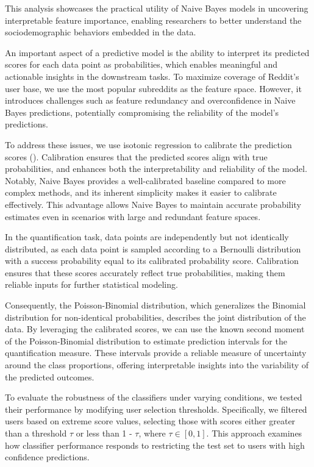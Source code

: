 This analysis showcases the practical utility of Naive Bayes models in uncovering interpretable feature importance, enabling researchers to better understand the sociodemographic behaviors embedded in the data.


An important aspect of a predictive model is the ability to interpret its predicted scores for each data point as probabilities, which enables meaningful and actionable insights in the downstream tasks.
To maximize coverage of Reddit's user base, we use the most popular subreddits as the feature space.
However, it introduces challenges such as feature redundancy and overconfidence in Naive Bayes predictions, potentially compromising the reliability of the model's predictions.

To address these issues, we use isotonic regression to calibrate the prediction scores ().
Calibration ensures that the predicted scores align with true probabilities, and enhances both the interpretability and reliability of the model.
Notably, Naive Bayes provides a well-calibrated baseline compared to more complex methods, and its inherent simplicity makes it easier to calibrate effectively.
This advantage allows Naive Bayes to maintain accurate probability estimates even in scenarios with large and redundant feature spaces.

In the quantification task, data points are independently but not identically distributed, as each data point is sampled according to a Bernoulli distribution with a success probability equal to its calibrated probability score.
Calibration ensures that these scores accurately reflect true probabilities, making them reliable inputs for further statistical modeling.

Consequently, the Poisson-Binomial distribution, which generalizes the Binomial distribution for non-identical probabilities, describes the joint distribution of the data.
By leveraging the calibrated scores, we can use the known second moment of the Poisson-Binomial distribution to estimate prediction intervals for the quantification measure.
These intervals provide a reliable measure of uncertainty around the class proportions, offering interpretable insights into the variability of the predicted outcomes.

To evaluate the robustness of the classifiers under varying conditions, we tested their performance by modifying user selection thresholds.
Specifically, we filtered users based on extreme score values, selecting those with scores either greater than a threshold $\tau$ or less than 1 - $\tau$, where $\tau \in [0, 1]$.
This approach examines how classifier performance responds to restricting the test set to users with high confidence predictions.

